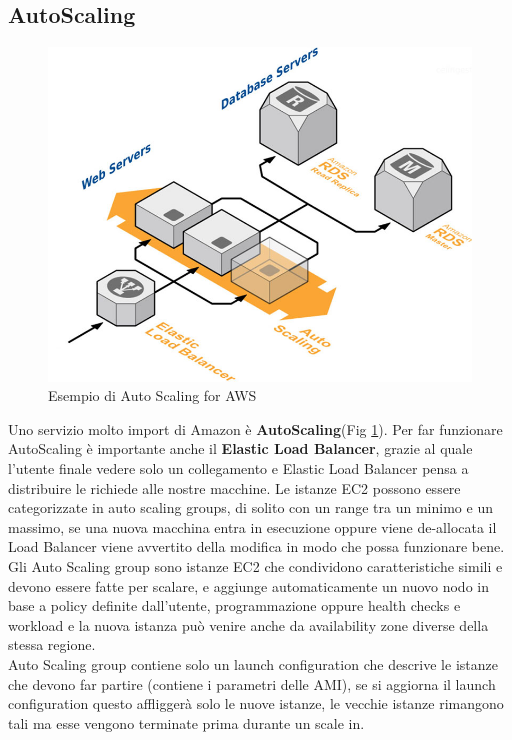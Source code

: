 \documentclass[11pt, twocolumn]{article}
\begin{document}
\subsection{AutoScaling}
\begin{figure}[!b]
	\centering
	\includegraphics[width=\linewidth]{imgs/load_balancer.jpg}
	\caption{Esempio di Auto Scaling for AWS}
	\label{fig:autoscaleAWS}
\end{figure}
Uno servizio molto import di Amazon è \textbf{AutoScaling}(Fig \ref{fig:autoscaleAWS}). Per far funzionare AutoScaling è importante anche il \textbf{Elastic Load Balancer}, grazie al quale l'utente finale vedere solo un collegamento e Elastic Load Balancer pensa a distribuire le richiede alle nostre macchine. 
Le istanze EC2 possono essere categorizzate in auto scaling groups, di solito con un range tra un minimo e un massimo, se una nuova macchina entra in esecuzione oppure viene de-allocata il Load Balancer viene avvertito della modifica in modo che possa funzionare bene.
Gli Auto Scaling group sono istanze EC2 che condividono caratteristiche simili e devono essere fatte per scalare, e aggiunge automaticamente un nuovo nodo in base a policy definite dall'utente, programmazione oppure health checks e workload e la nuova istanza può venire anche da availability zone diverse della stessa regione.\\
Auto Scaling group contiene solo un launch configuration che descrive le istanze che devono far partire (contiene i parametri delle AMI), se si aggiorna il launch configuration questo affliggerà solo le nuove istanze, le vecchie istanze rimangono tali ma esse vengono terminate prima durante un scale in.\\
\end{document}
